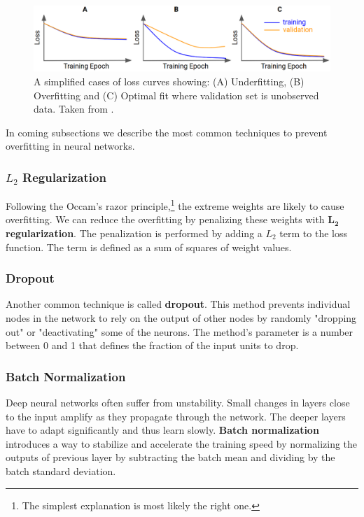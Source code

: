     \begin{figure}[h]
        \centering
        \includegraphics[width=\linewidth]{Sources/Figures/fitting.png}
        \caption{A simplified cases of loss curves showing:
            (A) Underfitting, (B) Overfitting and (C) Optimal fit where validation
            set is unobserved data. Taken from
            \cite{bileschi2020deep}.}
        \label{fig:loss_plot}
    \end{figure}

    In coming subsections we describe the most common techniques to prevent
    overfitting in neural networks.

    \subsubsection{$L_2$ Regularization}
    Following the Occam's razor principle,\footnote{The simplest explanation is most
        likely the right one.} the extreme weights are likely to cause overfitting. We
    can reduce the overfitting by penalizing these weights with $\boldsymbol{L_2}$
    \textbf{regularization}. The penalization is performed by adding a $L_2$ term to
the loss function. The term is defined as a sum of squares of weight values.

\subsubsection{Dropout}
Another common technique is called \textbf{dropout}. This method prevents
individual nodes in the network to rely on the output of other nodes by randomly
"dropping out" or "deactivating" some of the neurons. The method's parameter is
a number between 0 and 1 that defines the fraction of the input units to drop.

\subsubsection{Batch Normalization}
Deep neural networks often suffer from unstability. Small changes in layers
close to the input amplify as they propagate through the network. The deeper
layers have to adapt significantly and thus learn slowly.
\textbf{Batch normalization} introduces a way to stabilize and accelerate the
training speed by normalizing the outputs of previous layer by subtracting the
batch mean and dividing by the batch standard deviation.

